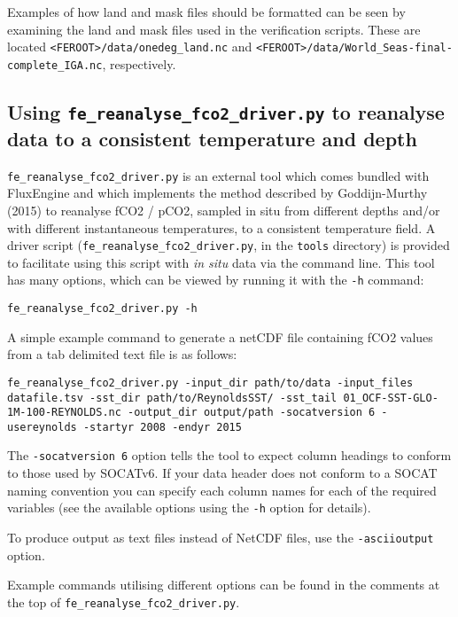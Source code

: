 \documentclass[]{scrartcl}
\begin{document}
Examples of how land and mask files should be formatted can be seen by examining the land and mask files used in the verification scripts. These are located \texttt{<FEROOT>/data/onedeg\_land.nc} and \texttt{<FEROOT>/data/World\_Seas-final-complete\_IGA.nc}, respectively.


\subsection{Using \texttt{fe\_reanalyse\_fco2\_driver.py} to reanalyse data to a consistent temperature and depth} \label{reanalyse_fco2_example}
\texttt{fe\_reanalyse\_fco2\_driver.py} is an external tool which comes bundled with FluxEngine and which implements the method described by Goddijn-Murthy (2015) to reanalyse fCO2 / pCO2, sampled in situ from different depths and/or with different instantaneous temperatures, to a consistent temperature field. A driver script (\texttt{fe\_reanalyse\_fco2\_driver.py}, in the \texttt{tools} directory) is provided to facilitate using this script with \textit{in situ} data via the command line. This tool has many options, which can be viewed by running it with the \texttt{-h} command:
\begin{lstlisting}
fe_reanalyse_fco2_driver.py -h
\end{lstlisting}

A simple example command to generate a netCDF file containing fCO2 values from a tab delimited text file is as follows:
\begin{lstlisting}
fe_reanalyse_fco2_driver.py -input_dir path/to/data -input_files datafile.tsv -sst_dir path/to/ReynoldsSST/ -sst_tail 01_OCF-SST-GLO-1M-100-REYNOLDS.nc -output_dir output/path -socatversion 6 -usereynolds -startyr 2008 -endyr 2015
\end{lstlisting}

The \texttt{-socatversion 6} option tells the tool to expect column headings to conform to those used by SOCATv6. If your data header does not conform to a SOCAT naming convention you can specify each column names for each of the required variables (see the available options using the \texttt{-h} option for details).

To produce output as text files instead of NetCDF files, use the \texttt{-asciioutput} option.

Example commands utilising different options can be found in the comments at the top of \texttt{fe\_reanalyse\_fco2\_driver.py}.
\end{document}
